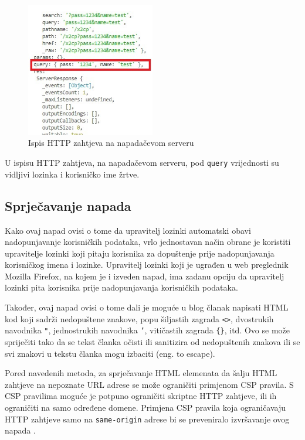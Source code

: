 \documentclass[12pt, oneside, onecolumn]{book}
\begin{document}
{\begin{figure}[H]
	\begin{center}
		\includegraphics[width=0.5\textwidth]{xss2cp_ser.jpg}
		\caption{Ispis HTTP zahtjeva na napadačevom serveru} \label{fig:xss2cp_ser}
	\end{center}
\end{figure}

U ispisu HTTP zahtjeva, na napadačevom serveru, pod \texttt{query} vrijednosti su vidljivi lozinka i korisničko ime žrtve.

\subsection{Sprječavanje napada}
Kako ovaj napad ovisi o tome da upravitelj lozinki automatski obavi nadopunjavanje korisničkih podataka, vrlo jednostavan način obrane je koristiti upravitelje lozinki koji pitaju korisnika za dopuštenje prije nadopunjavanja korisničkog imena i lozinke. Upravitelj lozinki koji je ugrađen u web preglednik Mozilla Firefox, na kojem je i izveden napad, ima zadanu opciju da upravitelj lozinki pita korisnika prije nadopunjavanja korisničkih podataka.

Također, ovaj napad ovisi o tome dali  je moguće u blog članak napisati HTML kod koji sadrži nedopuštene znakove, popu šiljastih zagrada \texttt{<>}, dvostrukih navodnika \texttt{"}, jednostrukih navodnika \texttt{'}, vitičastih zagrada \texttt{\{\}}, itd. Ovo se može spriječiti tako da se tekst članka očisti ili sanitizira od nedopuštenih znakova ili se svi znakovi u tekstu članka mogu izbaciti (eng. to escape).

Pored navedenih metoda, za sprječavanje HTML elemenata da šalju HTML zahtjeve na nepoznate URL adrese se može ograničiti primjenom CSP pravila. S CSP pravilima moguće je potpuno ograničiti skriptne HTTP zahtjeve, ili ih ograničiti na samo određene domene. Primjena CSP pravila koja ograničavaju HTTP zahtjeve samo na \texttt{same-origin} adrese bi se preveniralo izvršavanje ovog napada \cite{x2cpport}.

}
\end{document}
